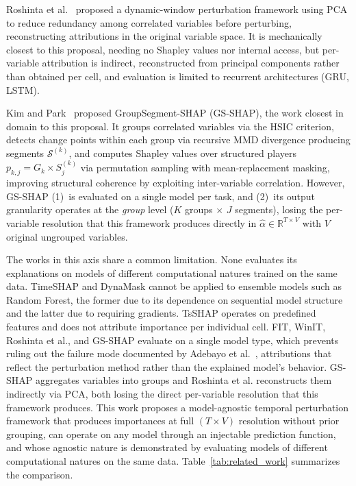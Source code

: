 \documentclass[runningheads]{llncs}
\begin{document}
Roshinta et al.~\cite{roshinta2026} proposed a dynamic-window
perturbation framework using PCA to reduce redundancy among
correlated variables before perturbing, reconstructing attributions
in the original variable space. It is mechanically closest to this
proposal, needing no Shapley values nor internal access, but
per-variable attribution is indirect, reconstructed from principal
components rather than obtained per cell, and evaluation is limited
to recurrent architectures (GRU, LSTM).

Kim and Park~\cite{gsshap2026} proposed GroupSegment-SHAP (GS-SHAP),
the work closest in domain to this proposal. It groups correlated
variables via the HSIC criterion, detects change points within each
group via recursive MMD divergence producing segments
$\mathcal{S}^{(k)}$, and computes Shapley values over structured
players $p_{k,j} = G_k \times S_j^{(k)}$ via permutation sampling
with mean-replacement masking, improving structural coherence by
exploiting inter-variable correlation. However, GS-SHAP (1)~is
evaluated on a single model per task, and (2)~its output granularity
operates at the \emph{group} level ($K$ groups $\times$ $J$
segments), losing the per-variable resolution that this framework
produces directly in $\hat{\alpha} \in \mathbb{R}^{T \times V}$ with
$V$ original ungrouped variables.

The works in this axis share a common limitation. None evaluates its
explanations on models of different computational natures trained on
the same data. TimeSHAP and DynaMask cannot be applied to ensemble
models such as Random Forest, the former due to its dependence on
sequential model structure and the latter due to requiring gradients.
TsSHAP operates on predefined features and does not attribute
importance per individual cell. FIT, WinIT, Roshinta et al., and
GS-SHAP evaluate on a single model type, which prevents ruling out
the failure mode documented by Adebayo et al.~\cite{adebayo2018},
attributions that reflect the perturbation method rather than the
explained model's behavior. GS-SHAP aggregates variables into groups
and Roshinta et al. reconstructs them indirectly via PCA, both losing
the direct per-variable resolution that this framework produces. This
work proposes a model-agnostic temporal perturbation framework that
produces importances at full $(T \times V)$ resolution without prior
grouping, can operate on any model through an injectable prediction
function, and whose agnostic nature is demonstrated by evaluating
models of different computational natures on the same data.
Table~\ref{tab:related_work} summarizes the comparison.
\end{document}
